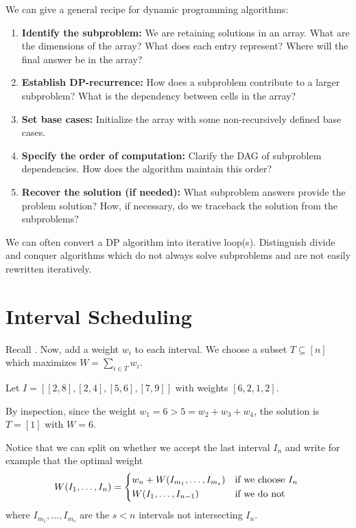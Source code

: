 We can give a general recipe for dynamic programming algorithms:
\begin{enumerate}[1.]
  \item \textbf{Identify the subproblem:}
        We are retaining solutions in an array.
        What are the dimensions of the array?
        What does each entry represent?
        Where will the final answer be in the array?
  \item \textbf{Establish DP-recurrence:}
        How does a subproblem contribute to a larger subproblem?
        What is the dependency between cells in the array?
  \item \textbf{Set base cases:}
        Initialize the array with some non-recursively defined base cases.
  \item \textbf{Specify the order of computation:}
        Clarify the DAG of subproblem dependencies.
        How does the algorithm maintain this order?
  \item \textbf{Recover the solution (if needed):}
        What subproblem answers provide the problem solution?
        How, if necessary, do we traceback the solution from the subproblems?
\end{enumerate}

We can often convert a DP algorithm into iterative loop(s).
Distinguish divide and conquer algorithms which do not always solve subproblems
and are not easily rewritten iteratively.

\section{Interval Scheduling}

\begin{problem}
  Recall .
  Now, add a weight $w_i$ to each interval.
  We choose a subset $T \subseteq [n]$ which maximizes $W = \sum_{i \in T} w_i$.
\end{problem}

\begin{example}
  Let $I = [[2,8], [2,4], [5,6], [7,9]]$ with weights $[6,2,1,2]$.
\end{example}
\begin{sol}
  By inspection, since the weight $w_1 = 6 > 5 = w_2 + w_3 + w_4$,
  the solution is $T = [1]$ with $W = 6$.
\end{sol}

Notice that we can split on whether we accept the last interval $I_n$
and write for example that the optimal weight
\[
  W(I_1,\dotsc,I_n) = \begin{cases*}
    w_n + W(I_{m_1},\dotsc,I_{m_s}) & if we choose $I_n$ \\
    W(I_1,\dotsc,I_{n-1})           & if we do not
  \end{cases*}
\]
where $I_{m_1},\dotsc,I_{m_s}$ are the $s < n$ intervals not intersecting $I_n$.

